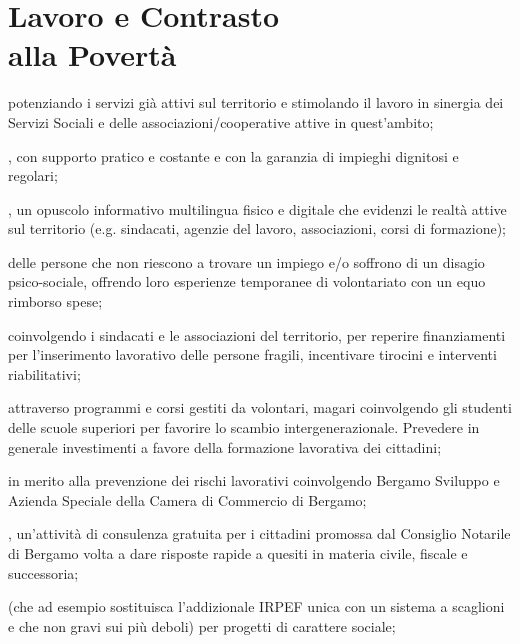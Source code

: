 \section[Lavoro e Contrasto alla Povertà]{Lavoro e Contrasto\\alla Povertà}
 potenziando i servizi già attivi sul territorio e stimolando il lavoro in sinergia dei Servizi Sociali e delle associazioni/cooperative attive in quest'ambito;

, con supporto pratico e costante e con la garanzia di impieghi dignitosi e regolari; 

, un opuscolo informativo multilingua fisico e digitale che evidenzi le realtà attive sul territorio (e.g. sindacati, agenzie del lavoro, associazioni, corsi di formazione);

 delle persone che non riescono a trovare un impiego e/o soffrono di un disagio psico-sociale, offrendo loro esperienze temporanee di volontariato con un equo rimborso spese;

 coinvolgendo i sindacati e le associazioni del territorio, per reperire finanziamenti per l'inserimento lavorativo delle persone fragili, incentivare tirocini e interventi riabilitativi;

 attraverso programmi e corsi gestiti da volontari, magari coinvolgendo gli studenti delle scuole superiori per favorire lo scambio intergenerazionale. Prevedere in generale investimenti a favore della formazione lavorativa dei cittadini;

 in merito alla  prevenzione dei rischi lavorativi coinvolgendo  Bergamo Sviluppo e Azienda Speciale della Camera di Commercio di Bergamo;

, un'attività di consulenza gratuita per i cittadini promossa dal Consiglio Notarile di Bergamo volta a dare risposte rapide a quesiti in materia civile, fiscale e successoria;

 (che ad esempio sostituisca l'addizionale IRPEF unica con un sistema a scaglioni e che non gravi sui più deboli) per progetti di carattere sociale;


